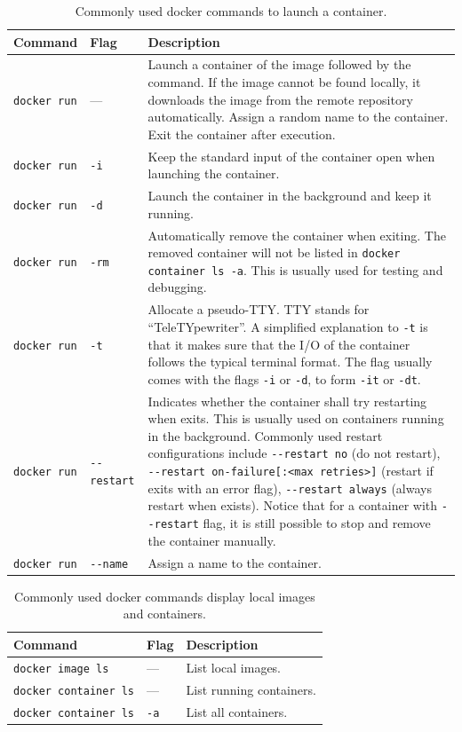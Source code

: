 \begin{table}
	\centering \caption{Commonly used docker commands to launch a container.}\label{ch:vac:tab:launchcontainer}
	\begin{tabularx}{\textwidth}{llX}
		\hline
		Command & Flag & Description \\ \hline
		\verb|docker run| & --- & Launch a container of the image followed by the command. If the image cannot be found locally, it downloads the image from the remote repository automatically. Assign a random name to the container. Exit the container after execution. \\ \hdashline
        \verb|docker run| & \verb|-i| & Keep the standard input of the container open when launching the container. \\ \hdashline
        \verb|docker run| & \verb|-d| & Launch the container in the background and keep it running. \\ \hdashline
        \verb|docker run| & \verb|-rm| & Automatically remove the container when exiting. The removed container will not be listed in \verb|docker container ls -a|. This is usually used for testing and debugging. \\ \hdashline
        \verb|docker run| & \verb|-t| & Allocate a pseudo-TTY. TTY stands for ``TeleTYpewriter''. A simplified explanation to \verb|-t| is that it makes sure that the I/O of the container follows the typical terminal format. The flag usually comes with the flags \verb|-i| or \verb|-d|, to form \verb|-it| or \verb|-dt|. \\ \hdashline
        \verb|docker run| & \verb|--restart| & Indicates whether the container shall try restarting when exits. This is usually used on containers running in the background. Commonly used restart configurations include \verb|--restart no| (do not restart), \verb|--restart on-failure[:<max retries>]| (restart if exits with an error flag), \verb|--restart always| (always restart when exists). Notice that for a container with \verb|--restart| flag, it is still possible to stop and remove the container manually. \\ \hdashline
        \verb|docker run| & \verb|--name| & Assign a name to the container. \\
		\hline
	\end{tabularx}
\end{table}

\begin{table}
	\centering \caption{Commonly used docker commands display local images and containers.}\label{ch:vac:tab:listcontainer}
	\begin{tabularx}{\textwidth}{llX}
		\hline
		Command & Flag & Description \\ \hline
        \verb|docker image ls| & --- & List local images. \\ \hdashline
        \verb|docker container ls| & --- & List running containers. \\ \hdashline
        \verb|docker container ls| & \verb|-a| & List all containers. \\
		\hline
	\end{tabularx}
\end{table}

